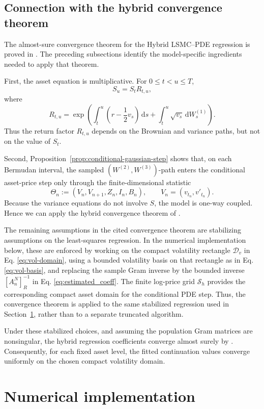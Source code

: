 \documentclass[pdflatex,sn-mathphys-num]{sn-jnl}
\theoremstyle{thmstyleone}%
\theoremstyle{thmstylethree}%
\theoremstyle{thmstyletwo}%
\newcommand{\dd}{\mathrm d}
\begin{document}
\subsection{Connection with the hybrid convergence theorem}\label{sec:as_convergence}

The almost-sure convergence theorem for the Hybrid LSMC--PDE regression is proved in \cite{farahany2020mixing}. The preceding subsections identify the model-specific ingredients needed to apply that theorem.

First, the asset equation is multiplicative. For $0\le t<u\le T$,
$$
S_u=S_tR_{t,u},
$$
where
$$
R_{t,u}
=
\exp\left(
\int_t^u\left(r-\frac12v_s\right)\,\dd s
+
\int_t^u\sqrt{v_s}\,\dd W_s^{(1)}
\right).
$$
Thus the return factor $R_{t,u}$ depends on the Brownian and variance paths,
but not on the value of $S_t$.

Second, Proposition~\ref{prop:conditional-gaussian-step} shows that, on each
Bermudan interval, the sampled $(W^{(2)},W^{(3)})$-path enters the conditional
asset-price step only through the finite-dimensional statistic
$$
\Theta_n
:=
(V_n,V_{n+1},Z_n,I_n,B_n),
\qquad
V_n=(v_{t_n},v'_{t_n}).
$$
Because the variance equations do not involve $S$, the model is one-way
coupled. Hence we can apply the hybrid convergence theorem of
\cite[Theorem~1]{farahany2020mixing}.

The remaining assumptions in the cited convergence theorem are stabilizing assumptions on the least-squares regression. In the numerical implementation below, these are enforced by working on the compact volatility rectangle $\mathcal D_v$ in Eq. \eqref{eq:vol-domain}, using a bounded volatility basis on that rectangle as in Eq. \eqref{eq:vol-basis}, and replacing the sample Gram inverse by the bounded inverse $[A_n^N]^{-1}_R$ in Eq. \eqref{eq:estimated_coeff}. The finite log-price grid $\mathcal S_h$ provides the corresponding compact asset domain
for the conditional PDE step. Thus, the convergence theorem is applied to the same stabilized regression used in Section~\ref{sec:hybrid-method}, rather than to a separate truncated algorithm.

Under these stabilized choices, and assuming the population Gram matrices are
nonsingular, the hybrid regression coefficients converge almost surely by
\cite[Theorem~1]{farahany2020mixing}. Consequently, for each fixed asset level,
the fitted continuation values converge uniformly on the chosen compact
volatility domain.
\section{Numerical implementation}
\label{sec:hybrid-method}
\end{document}
